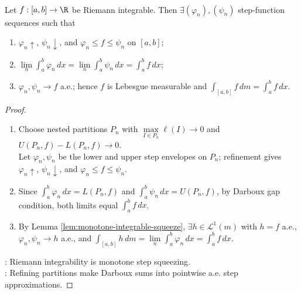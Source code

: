 \begin{corollary} \label{cor:riemann-integrable-monotone-step-approximation} \\
Let $f:[a,b]\to\R$ be Riemann integrable. Then $\exists(\varphi_n),(\psi_n)$ step-function sequences such that
\begin{enumerate}[label=(\roman*)]
\setlength{\itemsep}{0pt}
\item $\varphi_n\uparrow$, $\psi_n\downarrow$, and $\varphi_n\leq f\leq\psi_n$ on $[a,b]$;
\item $\lim\limits_n\int_a^b\varphi_n\,dx=\lim\limits_n\int_a^b\psi_n\,dx=\int_a^bf\,dx$;
\item $\varphi_n,\psi_n\to f$ a.e.; hence $f$ is Lebesgue measurable and $\int_{[a,b]}f\,dm=\int_a^bf\,dx$.
\end{enumerate}
\begin{proof}
\begin{enumerate}[label=(\roman*)]
\setlength{\itemsep}{0pt}
\item Choose nested partitions $P_n$ with $\max\limits_{I\in P_n}\ell(I)\to0$ and $U(P_n,f)-L(P_n,f)\to0$.\\
Let $\varphi_n,\psi_n$ be the lower and upper step envelopes on $P_n$; refinement gives $\varphi_n\uparrow$, $\psi_n\downarrow$, and $\varphi_n\leq f\leq\psi_n$.
\item Since $\int_a^b\varphi_n\,dx=L(P_n,f)$ and $\int_a^b\psi_n\,dx=U(P_n,f)$, by Darboux gap condition, both limits equal $\int_a^bf\,dx$.
\item By Lemma \ref{lem:monotone-integrable-squeeze}, $\exists h\in\mathscr{L}^1(m)$ with $h=f$ a.e., $\varphi_n,\psi_n\to h$ a.e., and $\int_{[a,b]}h\,dm=\lim\limits_n\int_a^b\varphi_n\,dx=\int_a^bf\,dx$.
\end{enumerate}
: Riemann integrability is monotone step squeezing.\\
: Refining partitions make Darboux sums into pointwise a.e. step approximations.
\end{proof}
\end{corollary}

